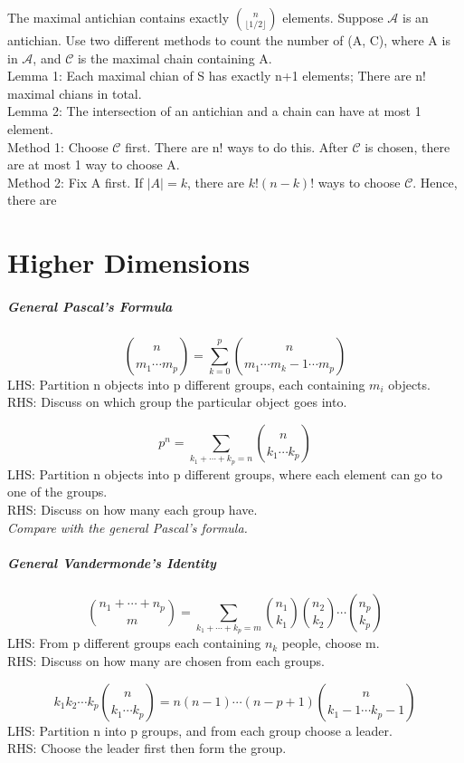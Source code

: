 \documentclass{article}
\begin{document}
	The maximal antichian contains exactly ${n \choose \lfloor 1/2 \rfloor}$ elements.
	Suppose $\mathcal{A}$ is an antichian. Use two different methods to count the number of (A, C), where A is in $\mathcal{A}$, and $\mathcal{C}$ is the maximal chain containing A.\\
	Lemma 1: Each maximal chian of S has exactly n+1 elements; There are n! maximal chians in total.\\
	Lemma 2: The intersection of an antichian and a chain can have at most 1 element.\\  
	Method 1: Choose $\mathcal{C}$ first. There are n! ways to do this. After $\mathcal{C}$ is chosen, there are at most 1 way to choose A.\\
	Method 2: Fix A first. If $|A| = k$, there are $k!(n-k)!$ ways to choose $\mathcal{C}$. Hence, there are 

	\section{Higher Dimensions}
	\subparagraph{General Pascal's Formula}
	$${n \choose m_1 \cdots m_p} = \sum_{k=0}^{p} {n \choose m_1 \cdots m_k -1 \cdots m_p}$$
	LHS: Partition n objects into p different groups, each containing $m_i$ objects.\\
	RHS: Discuss on which group the particular object goes into. 

	$$ p^n = \sum_{k_1+\cdots + k_p = n} {n \choose k_1 \cdots k_p}$$
	LHS: Partition n objects into p different groups, where each element can go to one of the groups. \\
	RHS: Discuss on how many each group have.\\
	\textit{Compare with the general Pascal's formula.}

	\subparagraph{General Vandermonde's Identity}
	$${n_1+\cdots + n_p \choose m} = \sum_{k_1+\cdots + k_p = m} {n_1 \choose k_1} {n_2 \choose k_2} \cdots {n_p \choose k_p}$$
	LHS: From p different groups each containing $n_k$ people, choose m.\\
	RHS: Discuss on how many are chosen from each groups.

	$$ k_1 k_2 \cdots k_p {n \choose k_1 \cdots k_p} = n(n-1) \cdots (n-p+1) {n \choose k_1-1 \cdots k_p-1}$$
	LHS: Partition n into p groups, and from each group choose a leader.\\
	RHS: Choose the leader first then form the group.
\end{document}
